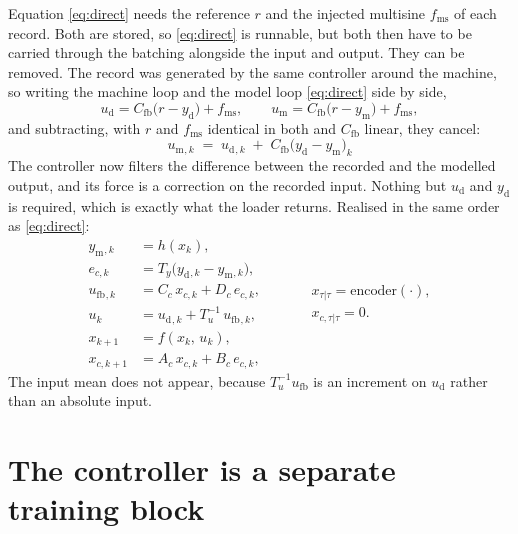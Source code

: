\documentclass[11pt]{article}
\newcommand{\Cfb}{C_{\mathrm{fb}}}
\newcommand{\fms}{f_{\mathrm{ms}}}
\newcommand{\ufb}{u_{\mathrm{fb}}}
\newcommand{\udata}{u_{\mathrm{d}}}
\newcommand{\umodel}{u_{\mathrm{m}}}
\newcommand{\ydata}{y_{\mathrm{d}}}
\newcommand{\ymodel}{y_{\mathrm{m}}}
\newcommand{\Tu}{T_{u}}
\newcommand{\Ty}{T_{y}}
\begin{document}
Equation \eqref{eq:direct} needs the reference $r$ and the injected multisine $\fms$ of each
record. Both are stored, so \eqref{eq:direct} is runnable, but both then have to be carried
through the batching alongside the input and output. They can be removed. The record was
generated by the same controller around the machine, so writing the machine loop and the model
loop \eqref{eq:direct} side by side,
\begin{equation}
  \udata = \Cfb\bigl(r - \ydata\bigr) + \fms ,
  \qquad
  \umodel = \Cfb\bigl(r - \ymodel\bigr) + \fms ,
  \label{eq:twoloops}
\end{equation}
and subtracting, with $r$ and $\fms$ identical in both and $\Cfb$ linear, they cancel:
\begin{equation}
  \boxed{\;
    \umodel{}_{,k} \;=\; \udata{}_{,k} \;+\; \Cfb\bigl(\ydata - \ymodel\bigr)_k \;}
  \label{eq:residual}
\end{equation}
The controller now filters the difference between the recorded and the modelled output, and its
force is a correction on the recorded input. Nothing but $\udata$ and $\ydata$ is required, which
is exactly what the loader returns. Realised in the same order as \eqref{eq:direct}:
\begin{equation}
  \begin{aligned}
    \ymodel{}_{,k} &= h(x_k) , \\
    e_{c,k}        &= \Ty\bigl(\ydata{}_{,k} - \ymodel{}_{,k}\bigr) , \\
    \ufb{}_{,k}    &= C_c\,x_{c,k} + D_c\,e_{c,k} , \\
    u_k            &= \udata{}_{,k} + \Tu^{-1}\,\ufb{}_{,k} , \\
    x_{k+1}        &= f(x_k,\, u_k) , \\
    x_{c,k+1}      &= A_c\,x_{c,k} + B_c\,e_{c,k} ,
  \end{aligned}
  \qquad
  \begin{aligned}
    &x_{\tau|\tau} = \mathrm{encoder}(\cdot) , \\[0.5mm]
    &x_{c,\tau|\tau} = 0 .
  \end{aligned}
  \label{eq:recursion}
\end{equation}
The input mean does not appear, because $\Tu^{-1}\ufb$ is an increment on $\udata$ rather than an
absolute input.

\section{The controller is a separate training block}
\end{document}
